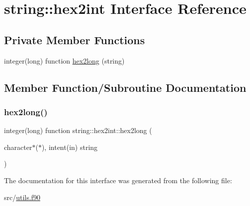 \hypertarget{interfacestring_1_1hex2int}{}\section{string\+:\+:hex2int Interface Reference}
\label{interfacestring_1_1hex2int}
\subsection*{Private Member Functions}
\begin{DoxyCompactItemize}
\item 
integer(long) function \hyperlink{interfacestring_1_1hex2int_a0a901aa1d536459bdc14c2f9aba9444e}{hex2long} (string)
\end{DoxyCompactItemize}


\subsection{Member Function/\+Subroutine Documentation}
\mbox{\label{interfacestring_1_1hex2int_a0a901aa1d536459bdc14c2f9aba9444e}} 
\subsubsection{\texorpdfstring{hex2long()}{hex2long()}}
{\footnotesize\ttfamily integer(long) function string\+::hex2int\+::hex2long (\begin{DoxyParamCaption}\item[{character$\ast$($\ast$), intent(in)}]{string }\end{DoxyParamCaption})\hspace{0.3cm}{\ttfamily [private]}}



The documentation for this interface was generated from the following file\+:\begin{DoxyCompactItemize}
\item 
src/\hyperlink{utils_8f90}{utils.\+f90}\end{DoxyCompactItemize}
